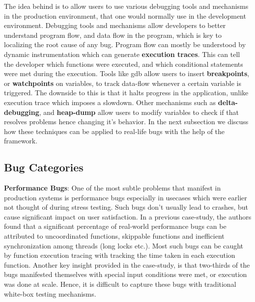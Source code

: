 The idea behind \parikshan is to allow users to use various debugging tools and mechanisms in the production environment, that one would normally use in the development environment.
Debugging tools and mechanisms allow developers to better understand program flow, and data flow in the program, which is key to localizing the root cause of any bug.
Program flow can mostly be understood by dynamic instrumentation which can generate \textbf{execution traces}. 
This can tell the developer which functions were executed, and which conditional statements were met during the execution.
Tools like gdb allow users to insert \textbf{breakpoints}, or \textbf{watchpoints} on variables, to track data-flow whenever a certain variable is triggered.
The downside to this is that it halts progress in the application, unlike execution trace which imposes a slowdown. 
Other mechanisms such as \textbf{delta-debugging}, and \textbf{heap-dump} allow users to modify variables to check if that resolves problems hence changing it's behavior.
In the next subsection we discuss how these techniques can be applied to real-life bugs with the help of the \parikshan framework.

\subsection{Bug Categories}
\label{sec:bugCategories}


\textbf{Performance Bugs}: One of the most subtle problems that manifest in production systems is performance bugs especially in usecases which were earlier not thought of during stress testing.
Such bugs don't usually lead to crashes, but cause significant impact on user satisfaction.
In a previous case-study\cite{shanluPerf}, the authors found that a significant percentage of real-world performance bugs can be attributed to uncoordinated functions, skippable functions and inefficient synchronization among threads (long locks etc.).
Most such bugs can be caught by function execution tracing with tracking the time taken in each execution function.
Another key insight provided in the case-study, is that two-thirds of the bugs manifested themselves with special input conditions were met, or execution was done at scale. Hence, it is difficult to capture these bugs with traditional white-box testing mechanisms.

